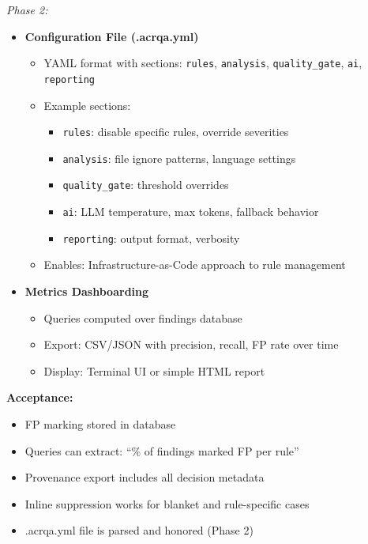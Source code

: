 \documentclass[11pt,a4paper]{article}
\begin{document}
\textit{Phase 2:}
\begin{itemize}[leftmargin=*]
    \item \textbf{Configuration File (.acrqa.yml)}
    \begin{itemize}
        \item YAML format with sections: \texttt{rules}, \texttt{analysis}, \texttt{quality\_gate}, \texttt{ai}, \texttt{reporting}
        \item Example sections:
        \begin{itemize}
            \item \texttt{rules}: disable specific rules, override severities
            \item \texttt{analysis}: file ignore patterns, language settings
            \item \texttt{quality\_gate}: threshold overrides
            \item \texttt{ai}: LLM temperature, max tokens, fallback behavior
            \item \texttt{reporting}: output format, verbosity
        \end{itemize}
        \item Enables: Infrastructure-as-Code approach to rule management
    \end{itemize}

    \item \textbf{Metrics Dashboarding}
    \begin{itemize}
        \item Queries computed over findings database
        \item Export: CSV/JSON with precision, recall, FP rate over time
        \item Display: Terminal UI or simple HTML report
    \end{itemize}
\end{itemize}

\textbf{Acceptance:}
\begin{itemize}[leftmargin=*]
    \item[$\checkmark$] FP marking stored in database
    \item[$\checkmark$] Queries can extract: ``\% of findings marked FP per rule''
    \item[$\checkmark$] Provenance export includes all decision metadata
    \item[$\checkmark$] Inline suppression works for blanket and rule-specific cases
    \item[$\checkmark$] .acrqa.yml file is parsed and honored (Phase 2)
\end{itemize}
\end{document}
